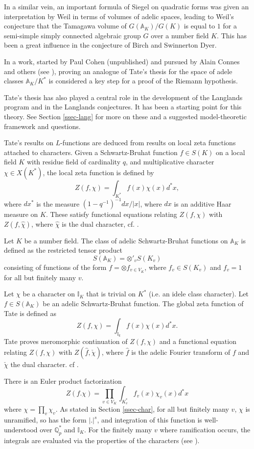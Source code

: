 \documentclass[12pt]{amsart}
\def\A{\mathbb{A}}
\def\I{\mathbb{I}}
\def\Q{\mathbb{Q}}
\numberwithin{equation}{section}
\begin{document}
In a similar vein, an important formula of Siegel on quadratic forms was given an interpretation by Weil in terms of volumes of adelic spaces, leading to Weil's conjecture that the Tamagawa volume of $G(\A_K)/G(K)$ is equal to $1$ for a semi-simple simply connected algebraic group $G$ over a number field $K$. 
This has been a great influence in the conjecture of Birch and Swinnerton Dyer. 

In a work, started by Paul Cohen (unpublished) and pursued by Alain Connes and others (see \cite{connes-selecta}), proving an analogue of Tate's thesis for the space of adele classes $\A_K/K^*$ is considered a key step for a proof of the Riemann hypothesis.

Tate's thesis has also played a central role in the development of the Langlands program and in the Langlands conjectures. It has been a starting point for this theory. See Section \ref{ssec-lang} for more on these and a suggested model-theoretic framework and questions.

Tate's results on $L$-functions are deduced from results on local zeta functions attached to characters. Given a Schwartz-Bruhat function $f\in S(K)$ on a local field $K$ with residue field of cardinality $q$, 
and multiplicative character $\chi\in X(K^*)$, the local zeta function is defined by 
$$Z(f,\chi)=\int_{K^*}f(x)\chi(x)d^*x,$$
where $dx^*$ is the measure $(1-q^{-1})^{-1}dx/|x|$, where $dx$ is an additive Haar measure on $K$. These satisfy functional equations relating $Z(f,\chi)$ with $Z(f,\hat{\chi})$, where $\hat{\chi}$ is the dual character, cf. \cite{tate-thesis}.

Let $K$ be a number field. The class of adelic Schwartz-Bruhat functions on $\A_K$ is defined as the restricted tensor product
$$S(\A_K)=\otimes'_v S(K_v)$$
consisting of functions of the form $f=\otimes f_{v\in V_K}$, where $f_v\in S(K_v)$ and $f_v=1$ for all but finitely many $v$. 

Let $\chi$ be a character on $\I_K$ that is trivial on $K^*$ (i.e. an idele class character). Let $f\in S(\A_K)$ be an adelic Schwartz-Bruhat function. The global zeta function of Tate is defined as
$$Z(f,\chi)=\int_{\I_k} f(x)\chi(x) d^*x.$$
Tate proves meromorphic continuation of $Z(f,\chi)$ and a functional equation relating $Z(f,\chi)$ with
$Z(\hat{f},\check{\chi})$, where $\hat{f}$ is the adelic Fourier transform of $f$ and $\check{\chi}$ the dual character. cf \cite{tate-thesis}. 

There is an Euler product factorization 
$$Z(f.\chi)=\prod_{v\in V_K} \int_{K_v^*} f_v(x)\chi_v(x)d^*x$$
where $\chi=\prod_v \chi_v$. As stated in Section \ref{ssec-char}, for all but finitely many $v$, $\chi$ is unramified, so has the form $|.|^s$, and integration of this function is well-understood over $\Q_p^*$ and $\I_K$. 
For the finitely many $v$ where ramification occurs, the integrals are evaluated via the properties of the characters (see \cite{tate-thesis}).
\end{document}
